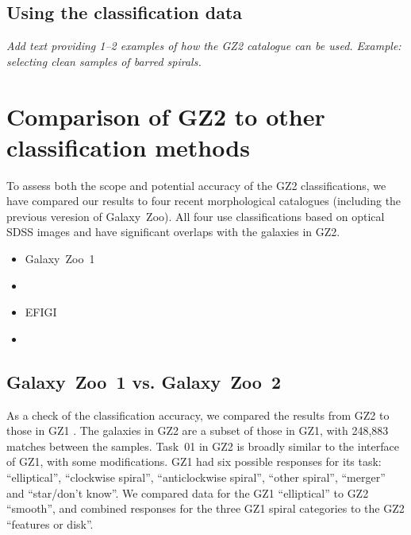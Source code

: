 \documentclass[useAMS,usenatbib]{mn2e}
\begin{document}
\subsection{Using the classification data}\label{ssec-usingdata}

{\it Add text providing 1--2 examples of how the GZ2 catalogue can be used. Example: selecting clean samples of barred spirals.}


\section{Comparison of GZ2 to other classification methods}\label{sec-comparison}

To assess both the scope and potential accuracy of the GZ2 classifications, we have compared our results to four recent morphological catalogues (including the previous veresion of Galaxy~Zoo). All four use classifications based on optical SDSS images and have significant overlaps with the galaxies in GZ2. 

\begin{itemize}
	\item Galaxy~Zoo~1 \citep{lin11}
	\item \citet{nai10}
	\item EFIGI \citep{bai11}
	\item \citet{hue11}
\end{itemize}


\subsection{Galaxy~Zoo~1 vs. Galaxy~Zoo~2}

As a check of the classification accuracy, we compared the results from GZ2 to those in GZ1 \citep{lin11}. The galaxies in GZ2 are a subset of those in GZ1, with 248,883 matches between the samples. Task~01 in GZ2 is broadly similar to the interface of GZ1, with some modifications. GZ1 had six possible responses for its task: ``elliptical'', ``clockwise spiral'', ``anticlockwise spiral'', ``other spiral'', ``merger'' and ``star/don't know''. We compared data for the GZ1 ``elliptical'' to GZ2 ``smooth'', and combined responses for the three GZ1 spiral categories to the GZ2 ``features or disk''. 
\end{document}

